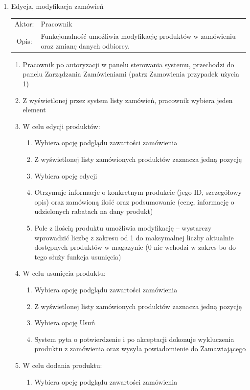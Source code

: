 \begin{enumerate}
  \item Edycja, modyfikacja zamówień\\
  \begin{tabularx}{\linewidth}{c X}
  Aktor: & Pracownik \\
  Opis: & Funkcjonalność umożliwia modyfikację produktów w zamówieniu oraz
  zmianę danych odbiorcy.
  \end{tabularx}
	\begin{enumerate}
	  \item Pracownik po autoryzacji w panelu sterowania systemu, przechodzi do
	  panelu Zarządzania Zamówieniami (patrz Zamowienia przypadek użycia 1)
	  \item Z wyświetlonej przez system listy zamówień, pracownik wybiera jeden
	  element
	  \item W celu edycji produktów:
		\begin{enumerate}
		  \item Wybiera opcję podglądu zawartości zamówienia
		  \item Z wyświetlonej listy zamówionych produktów zaznacza jedną pozycję
		  \item Wybiera opcję edycji
		  \item Otrzymuje informacje o konkretnym produkcie (jego ID, szczegółowy opis)
		  oraz zamówioną ilość oraz podsumowanie (cenę, informację o udzielonych rabatach na dany produkt)
		  \item Pole z ilością produktu umożliwia modyfikację – wystarczy wprowadzić
		  liczbę z zakresu od 1 do maksymalnej liczby aktualnie dostępnych produktów w
		  magazynie (0 nie wchodzi w zakres bo do tego służy funkcja usunięcia)
		\end{enumerate}
	  \item W celu usunięcia produktu:
		\begin{enumerate}
		  \item Wybiera opcję podglądu zawartości zamówienia
		  \item Z wyświetlonej listy zamówionych produktów zaznacza jedną pozycję
		  \item Wybiera opcję Usuń
		  \item System pyta o potwierdzenie i po akceptacji dokonuje wykluczenia
		  produktu z zamówienia oraz wysyła powiadomienie do Zamawiającego
		\end{enumerate}
	  \item W celu dodania produktu:
		\begin{enumerate}
		  \item Wybiera opcję podglądu zawartości zamówienia

\end{enumerate}
\end{enumerate}
\end{enumerate}
